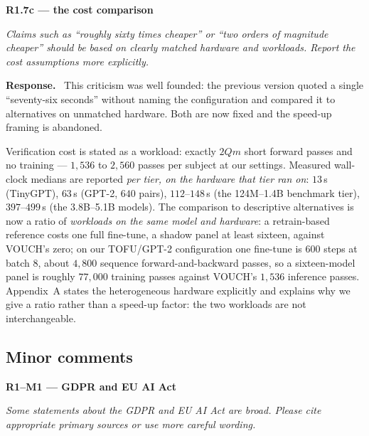 \documentclass[11pt,a4paper]{article}
\newenvironment{point}[1]{%
  \par\medskip\noindent\textbf{\color{rcol}#1}\par\nopagebreak\smallskip\begingroup
  \color{rcol}\itshape}{\endgroup\par}
\newenvironment{reply}{%
  \par\smallskip\noindent\textbf{\color{acol}Response.}\ \begingroup}{\endgroup\par}
\begin{document}
\begin{point}{R1.7c --- the cost comparison}
Claims such as ``roughly sixty times cheaper'' or ``two orders of magnitude cheaper''
should be based on clearly matched hardware and workloads. Report the cost assumptions
more explicitly.
\end{point}

\begin{reply}
This criticism was well founded: the previous version quoted a single
``seventy-six seconds'' without naming the configuration and compared it to
alternatives on unmatched hardware. Both are now fixed and the speed-up framing is
abandoned.

Verification cost is stated as a workload: exactly $2Qm$ short forward passes and no
training --- $1{,}536$ to $2{,}560$ passes per subject at our settings. Measured
wall-clock medians are reported \emph{per tier, on the hardware that tier ran on}:
$13$\,s (TinyGPT), $63$\,s (GPT-2, $640$ pairs), $112$--$148$\,s (the 124M--1.4B
benchmark tier), $397$--$499$\,s (the 3.8B--5.1B models). The comparison to descriptive
alternatives is now a ratio of \emph{workloads on the same model and hardware}: a
retrain-based reference costs one full fine-tune, a shadow panel at least sixteen,
against VOUCH's zero; on our TOFU/GPT-2 configuration one fine-tune is $600$ steps at
batch $8$, about $4{,}800$ sequence forward-and-backward passes, so a sixteen-model
panel is roughly $77{,}000$ training passes against VOUCH's $1{,}536$ inference passes.
Appendix~A states the heterogeneous hardware explicitly and explains why we give a
ratio rather than a speed-up factor: the two workloads are not interchangeable.
\end{reply}

\subsection*{Minor comments}

\begin{point}{R1--M1 --- GDPR and EU AI Act}
Some statements about the GDPR and EU AI Act are broad. Please cite appropriate primary
sources or use more careful wording.
\end{point}
\end{document}
